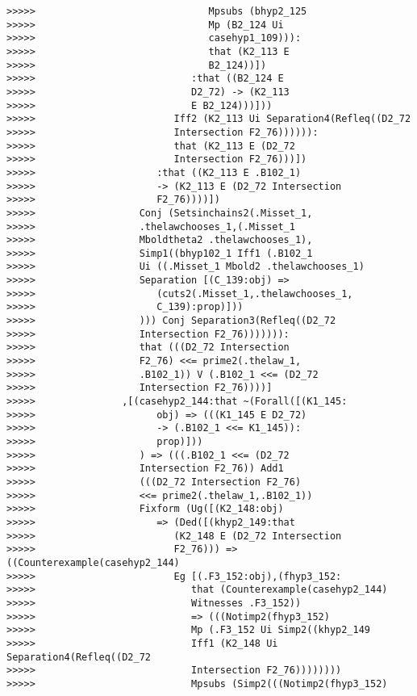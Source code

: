 \documentclass[12pt]{article}
\begin{document}
\begin{verbatim}
>>>>>                              Mpsubs (bhyp2_125
>>>>>                              Mp (B2_124 Ui
>>>>>                              casehyp1_109))):
>>>>>                              that (K2_113 E
>>>>>                              B2_124))])
>>>>>                           :that ((B2_124 E
>>>>>                           D2_72) -> (K2_113
>>>>>                           E B2_124)))]))
>>>>>                        Iff2 (K2_113 Ui Separation4(Refleq((D2_72
>>>>>                        Intersection F2_76)))))):
>>>>>                        that (K2_113 E (D2_72
>>>>>                        Intersection F2_76)))])
>>>>>                     :that ((K2_113 E .B102_1)
>>>>>                     -> (K2_113 E (D2_72 Intersection
>>>>>                     F2_76))))])
>>>>>                  Conj (Setsinchains2(.Misset_1,
>>>>>                  .thelawchooses_1,(.Misset_1
>>>>>                  Mboldtheta2 .thelawchooses_1),
>>>>>                  Simp1((bhyp102_1 Iff1 (.B102_1
>>>>>                  Ui ((.Misset_1 Mbold2 .thelawchooses_1)
>>>>>                  Separation [(C_139:obj) =>
>>>>>                     (cuts2(.Misset_1,.thelawchooses_1,
>>>>>                     C_139):prop)]))
>>>>>                  ))) Conj Separation3(Refleq((D2_72
>>>>>                  Intersection F2_76))))))):
>>>>>                  that (((D2_72 Intersection
>>>>>                  F2_76) <<= prime2(.thelaw_1,
>>>>>                  .B102_1)) V (.B102_1 <<= (D2_72
>>>>>                  Intersection F2_76))))]
>>>>>               ,[(casehyp2_144:that ~(Forall([(K1_145:
>>>>>                     obj) => (((K1_145 E D2_72)
>>>>>                     -> (.B102_1 <<= K1_145)):
>>>>>                     prop)]))
>>>>>                  ) => (((.B102_1 <<= (D2_72
>>>>>                  Intersection F2_76)) Add1
>>>>>                  (((D2_72 Intersection F2_76)
>>>>>                  <<= prime2(.thelaw_1,.B102_1))
>>>>>                  Fixform (Ug([(K2_148:obj)
>>>>>                     => (Ded([(khyp2_149:that
>>>>>                        (K2_148 E (D2_72 Intersection
>>>>>                        F2_76))) => ((Counterexample(casehyp2_144)
>>>>>                        Eg [(.F3_152:obj),(fhyp3_152:
>>>>>                           that (Counterexample(casehyp2_144)
>>>>>                           Witnesses .F3_152))
>>>>>                           => (((Notimp2(fhyp3_152)
>>>>>                           Mp (.F3_152 Ui Simp2((khyp2_149
>>>>>                           Iff1 (K2_148 Ui Separation4(Refleq((D2_72
>>>>>                           Intersection F2_76))))))))
>>>>>                           Mpsubs (Simp2(((Notimp2(fhyp3_152)

\end{verbatim}
\end{document}
